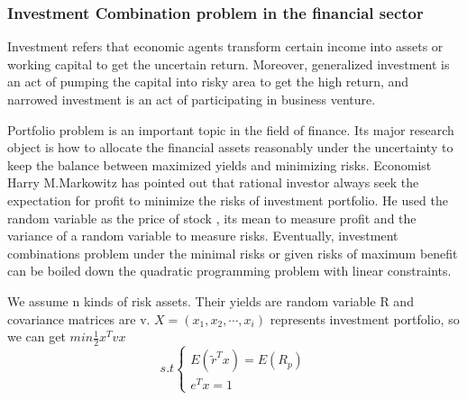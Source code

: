 \subsubsection{Investment Combination problem in the financial sector}
Investment refers that economic agents transform certain income into assets or working capital to get the uncertain return. Moreover, generalized investment is an act of pumping the capital into risky area to get the high return, and narrowed investment is an act of participating in business venture.\par
Portfolio problem is an important topic in the field of finance. Its major research object is how to allocate the financial assets reasonably under the uncertainty to keep the balance between maximized yields and minimizing risks. Economist Harry M.Markowitz has pointed out that rational investor always seek the expectation for profit to minimize the risks of investment portfolio. He used the random variable as the price of stock , its mean to measure profit and the variance of a random variable to measure risks. Eventually, investment combinations problem under the minimal risks or given risks of maximum benefit can be boiled down the quadratic programming problem with linear constraints.\par
We assume n kinds of risk assets. Their yields are random variable R and covariance matrices are v. $X=(x_1,x_2,\cdots,x_i)$ represents investment portfolio, so we can get 
$min \frac{1}{2}x^Tvx$	
$$s.t
\begin{cases}
E(\widetilde r^Tx)=E(R_p)\\
e^Tx=1
\end{cases}$$

